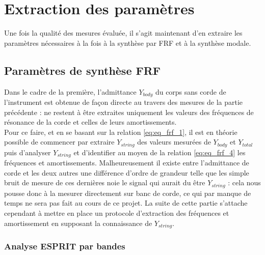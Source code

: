 \section{Extraction des paramètres}

Une fois la qualité des mesures évaluée, il s'agit maintenant d'en extraire les paramètres nécessaires à la fois à la synthèse par FRF et à la synthèse modale.

\subsection{Paramètres de synthèse FRF}

Dans le cadre de la première, l'admittance $Y_{body}$ du corps sans corde de l'instrument est obtenue de façon directe au travers des mesures de la partie précédente : ne restent à être extraites uniquement les valeurs des fréquences de résonance de la corde et celles de leurs amortissements.\\

Pour ce faire, et en se basant sur la relation \ref{eq:eq_frf_1}, il est en théorie possible de commencer par extraire $Y_{string}$ des valeurs mesurées de $Y_{body}$ et $Y_{total}$ puis d'analyser $Y_{string}$ et d'identifier au moyen de la relation \ref{eq:eq_frf_4} les fréquences et amortissements. Malheureusement il existe entre l'admittance de corde et les deux autres une différence d'ordre de grandeur telle que les simple bruit de mesure de ces dernières noie le signal qui aurait du être $Y_{string}$ : cela nous pousse donc à la mesurer directement sur banc de corde, ce qui par manque de temps ne sera pas fait au cours de ce projet. La suite de cette partie s'attache cependant à mettre en place un protocole d'extraction des fréquences et amortissement en supposant la connaissance de $Y_{string}$.\\

\subsubsection{Analyse ESPRIT par bandes}
\label{esprit}

